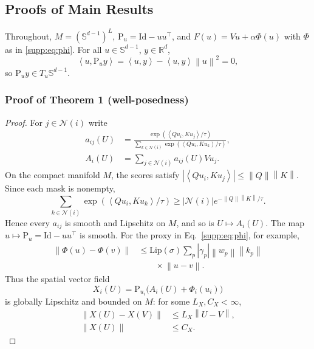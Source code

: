 \documentclass[11pt]{article}
\newcommand{\R}{\mathbb{R}}
\newcommand{\Sph}{\mathbb{S}}
\newcommand{\norm}[1]{\left\lVert #1 \right\rVert}
\newcommand{\ip}[2]{\left\langle #1,#2 \right\rangle}
\newcommand{\Proj}{\mathrm{P}}
\newcommand{\id}{\mathrm{Id}}
\begin{document}
\subsection{Proofs of Main Results}\label{app:proofs}
Throughout, $M=(\Sph^{d-1})^L$, $\Proj_u=\id-uu^\top$, and
$F(u)=Vu+\alpha\Phi(u)$ with $\Phi$ as in \eqref{supp:eq:phi}. For all $u\in\Sph^{d-1}$,
$y\in\R^d$,
\begin{equation}
\ip{u}{\Proj_u y}=\ip{u}{y}-\ip{u}{y}\norm{u}^2=0,
\label{eq:tangent}
\end{equation}
so $\Proj_u y\in T_u\Sph^{d-1}$.

\subsubsection{Proof of Theorem 1 (well-posedness)}
\begin{proof}
For $j\in\mathcal N(i)$ write
\begin{equation}
\begin{split}
a_{ij}(U)&=
\frac{\exp(\ip{Qu_i}{Ku_j}/\tau)}
{\sum_{k\in\mathcal N(i)}\exp(\ip{Qu_i}{Ku_k}/\tau)},
\\
A_i(U)&=\sum_{j\in\mathcal N(i)}a_{ij}(U)Vu_j.
\label{eq:attention-weights}
\end{split}
\end{equation}
On the compact manifold $M$, the scores satisfy
$|\ip{Qu_i}{Ku_j}|\le\norm Q\norm K$. Since each mask is nonempty,
\begin{equation}
\sum_{k\in\mathcal N(i)}\exp(\ip{Qu_i}{Ku_k}/\tau)
\ge |\mathcal N(i)|e^{-\norm Q\norm K/\tau}.
\end{equation}
Hence every $a_{ij}$ is smooth and Lipschitz on $M$, and so is
$U\mapsto A_i(U)$. The map $u\mapsto\Proj_u=\id-uu^\top$ is smooth. For the
proxy in Eq.~\eqref{supp:eq:phi}, for example,
\begin{equation}
\begin{aligned}
\norm{\Phi(u)-\Phi(v)}
&\le \mathrm{Lip}(\sigma)
\sum_p|\gamma_p|\norm{w_p}\norm{k_p}\\
&\qquad\times\norm{u-v}.
\end{aligned}
\label{eq:phi-lipschitz}
\end{equation}
Thus the spatial vector field
\begin{equation}
X_i(U)=\Proj_{u_i}\big(A_i(U)+\Phi_i(u_i)\big)
\end{equation}
is globally Lipschitz and bounded on $M$: for some $L_X,C_X<\infty$,
\begin{equation}
\begin{aligned}
\norm{X(U)-X(V)}&\le L_X\norm{U-V},\\
\norm{X(U)}&\le C_X.
\end{aligned}
\label{eq:spatial-bounds}
\end{equation}


\end{proof}
\end{document}
